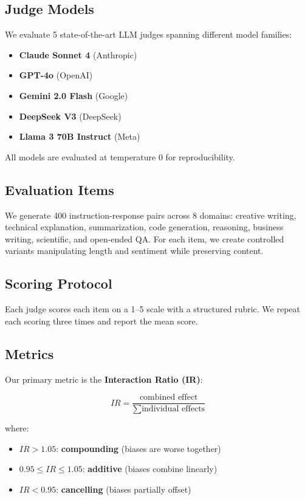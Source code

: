 \documentclass[11pt,twocolumn]{article}
\begin{document}
\subsection{Judge Models}

We evaluate 5 state-of-the-art LLM judges spanning different model families:
\begin{itemize}
    \item \textbf{Claude Sonnet 4} (Anthropic)
    \item \textbf{GPT-4o} (OpenAI)
    \item \textbf{Gemini 2.0 Flash} (Google)
    \item \textbf{DeepSeek V3} (DeepSeek)
    \item \textbf{Llama 3 70B Instruct} (Meta)
\end{itemize}
All models are evaluated at temperature 0 for reproducibility.

\subsection{Evaluation Items}

We generate 400 instruction-response pairs across 8 domains: creative writing, technical explanation, summarization, code generation, reasoning, business writing, scientific, and open-ended QA. For each item, we create controlled variants manipulating length and sentiment while preserving content.

\subsection{Scoring Protocol}

Each judge scores each item on a 1--5 scale with a structured rubric. We repeat each scoring three times and report the mean score.

\subsection{Metrics}

Our primary metric is the \textbf{Interaction Ratio (IR)}:

\begin{equation}
IR = \frac{\text{combined effect}}{\sum \text{individual effects}}
\end{equation}

where:
\begin{itemize}
    \item $IR > 1.05$: \textbf{compounding} (biases are worse together)
    \item $0.95 \leq IR \leq 1.05$: \textbf{additive} (biases combine linearly)
    \item $IR < 0.95$: \textbf{cancelling} (biases partially offset)
\end{itemize}
\end{document}
